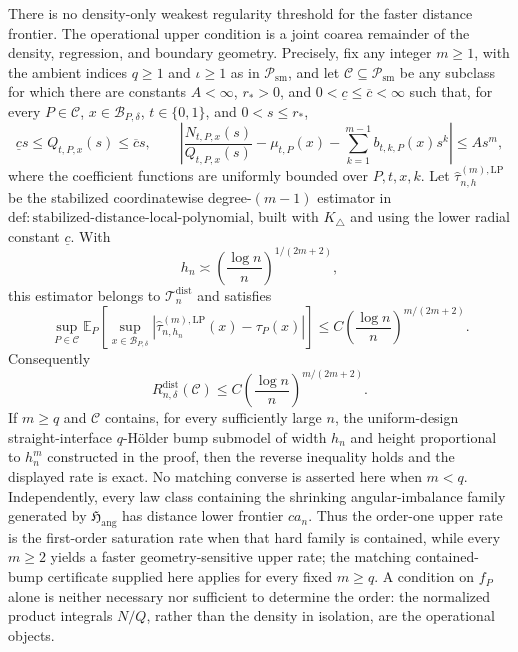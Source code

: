 There is no density-only weakest regularity threshold for the faster distance frontier.  The operational upper condition is a joint coarea remainder of the density, regression, and boundary geometry.  Precisely, fix any integer \(m\geq1\), with the ambient indices \(q\geq1\) and \(\iota\geq1\) as in \(\mathcal P_{\mathrm{sm}}\), and let \(\mathcal C\subseteq\mathcal P_{\mathrm{sm}}\) be any subclass for which there are constants \(A<\infty\), \(r_*>0\), and \(0<\underline c\leq\overline c<\infty\) such that, for every \(P\in\mathcal C\), \(x\in\mathcal B_{P,\delta}\), \(t\in\{0,1\}\), and \(0<s\leq r_*\),
\[
 \underline c s\leq Q_{t,P,x}(s)\leq\overline c s,
 \qquad
 \left|\frac{N_{t,P,x}(s)}{Q_{t,P,x}(s)}-\mu_{t,P}(x)-\sum_{k=1}^{m-1}b_{t,k,P}(x)s^k\right|\leq As^m,
\]
where the coefficient functions are uniformly bounded over \(P,t,x,k\).  Let \(\widehat\tau^{(m),\mathrm{LP}}_{n,h}\) be the stabilized coordinatewise degree-\((m-1)\) estimator in \(\mathrm{def:stabilized\text{-}distance\text{-}local\text{-}polynomial}\), built with \(K_\triangle\) and using the lower radial constant \(\underline c\).  With
\[
 h_n\asymp\left(\frac{\log n}{n}\right)^{1/(2m+2)},
\]
this estimator belongs to \(\mathcal T_n^{\mathrm{dist}}\) and satisfies
\[
 \sup_{P\in\mathcal C}\mathbb E_P\!\left[
 \sup_{x\in\mathcal B_{P,\delta}}
 \left|\widehat\tau^{(m),\mathrm{LP}}_{n,h_n}(x)-\tau_P(x)\right|
 \right]
 \leq C\left(\frac{\log n}{n}\right)^{m/(2m+2)}.
\]
Consequently
\[
 R_{n,\delta}^{\mathrm{dist}}(\mathcal C)
 \leq C\left(\frac{\log n}{n}\right)^{m/(2m+2)}.
\]
If \(m\geq q\) and \(\mathcal C\) contains, for every sufficiently large \(n\), the uniform-design straight-interface \(q\)-H\"older bump submodel of width \(h_n\) and height proportional to \(h_n^m\) constructed in the proof, then the reverse inequality holds and the displayed rate is exact.  No matching converse is asserted here when \(m<q\).  Independently, every law class containing the shrinking angular-imbalance family generated by \(\mathfrak H_{\mathrm{ang}}\) has distance lower frontier \(ca_n\).  Thus the order-one upper rate is the first-order saturation rate when that hard family is contained, while every \(m\geq2\) yields a faster geometry-sensitive upper rate; the matching contained-bump certificate supplied here applies for every fixed \(m\geq q\).  A condition on \(f_P\) alone is neither necessary nor sufficient to determine the order: the normalized product integrals \(N/Q\), rather than the density in isolation, are the operational objects.
